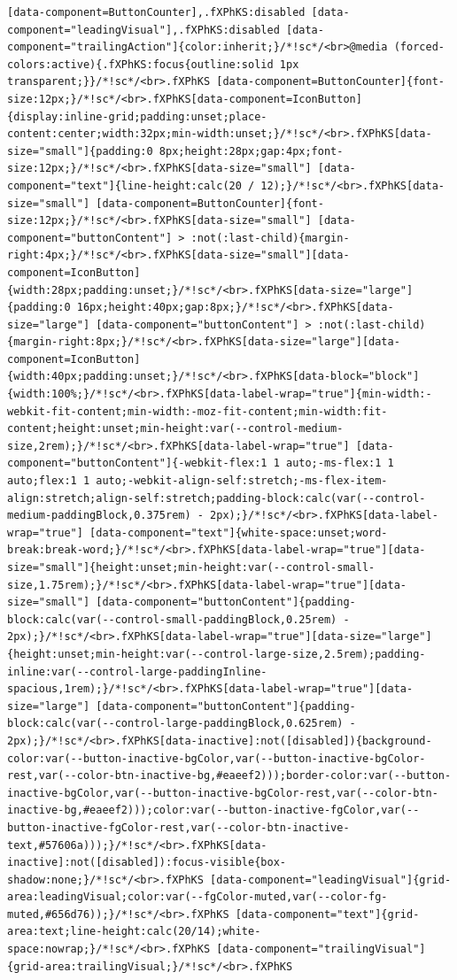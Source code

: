 \documentclass[
  letterpaper,
]{book}
\begin{document}
\begin{verbatim}
[data-component=ButtonCounter],.fXPhKS:disabled [data-component="leadingVisual"],.fXPhKS:disabled [data-component="trailingAction"]{color:inherit;}/*!sc*/<br>@media (forced-colors:active){.fXPhKS:focus{outline:solid 1px transparent;}}/*!sc*/<br>.fXPhKS [data-component=ButtonCounter]{font-size:12px;}/*!sc*/<br>.fXPhKS[data-component=IconButton]{display:inline-grid;padding:unset;place-content:center;width:32px;min-width:unset;}/*!sc*/<br>.fXPhKS[data-size="small"]{padding:0 8px;height:28px;gap:4px;font-size:12px;}/*!sc*/<br>.fXPhKS[data-size="small"] [data-component="text"]{line-height:calc(20 / 12);}/*!sc*/<br>.fXPhKS[data-size="small"] [data-component=ButtonCounter]{font-size:12px;}/*!sc*/<br>.fXPhKS[data-size="small"] [data-component="buttonContent"] > :not(:last-child){margin-right:4px;}/*!sc*/<br>.fXPhKS[data-size="small"][data-component=IconButton]{width:28px;padding:unset;}/*!sc*/<br>.fXPhKS[data-size="large"]{padding:0 16px;height:40px;gap:8px;}/*!sc*/<br>.fXPhKS[data-size="large"] [data-component="buttonContent"] > :not(:last-child){margin-right:8px;}/*!sc*/<br>.fXPhKS[data-size="large"][data-component=IconButton]{width:40px;padding:unset;}/*!sc*/<br>.fXPhKS[data-block="block"]{width:100%;}/*!sc*/<br>.fXPhKS[data-label-wrap="true"]{min-width:-webkit-fit-content;min-width:-moz-fit-content;min-width:fit-content;height:unset;min-height:var(--control-medium-size,2rem);}/*!sc*/<br>.fXPhKS[data-label-wrap="true"] [data-component="buttonContent"]{-webkit-flex:1 1 auto;-ms-flex:1 1 auto;flex:1 1 auto;-webkit-align-self:stretch;-ms-flex-item-align:stretch;align-self:stretch;padding-block:calc(var(--control-medium-paddingBlock,0.375rem) - 2px);}/*!sc*/<br>.fXPhKS[data-label-wrap="true"] [data-component="text"]{white-space:unset;word-break:break-word;}/*!sc*/<br>.fXPhKS[data-label-wrap="true"][data-size="small"]{height:unset;min-height:var(--control-small-size,1.75rem);}/*!sc*/<br>.fXPhKS[data-label-wrap="true"][data-size="small"] [data-component="buttonContent"]{padding-block:calc(var(--control-small-paddingBlock,0.25rem) - 2px);}/*!sc*/<br>.fXPhKS[data-label-wrap="true"][data-size="large"]{height:unset;min-height:var(--control-large-size,2.5rem);padding-inline:var(--control-large-paddingInline-spacious,1rem);}/*!sc*/<br>.fXPhKS[data-label-wrap="true"][data-size="large"] [data-component="buttonContent"]{padding-block:calc(var(--control-large-paddingBlock,0.625rem) - 2px);}/*!sc*/<br>.fXPhKS[data-inactive]:not([disabled]){background-color:var(--button-inactive-bgColor,var(--button-inactive-bgColor-rest,var(--color-btn-inactive-bg,#eaeef2)));border-color:var(--button-inactive-bgColor,var(--button-inactive-bgColor-rest,var(--color-btn-inactive-bg,#eaeef2)));color:var(--button-inactive-fgColor,var(--button-inactive-fgColor-rest,var(--color-btn-inactive-text,#57606a)));}/*!sc*/<br>.fXPhKS[data-inactive]:not([disabled]):focus-visible{box-shadow:none;}/*!sc*/<br>.fXPhKS [data-component="leadingVisual"]{grid-area:leadingVisual;color:var(--fgColor-muted,var(--color-fg-muted,#656d76));}/*!sc*/<br>.fXPhKS [data-component="text"]{grid-area:text;line-height:calc(20/14);white-space:nowrap;}/*!sc*/<br>.fXPhKS [data-component="trailingVisual"]{grid-area:trailingVisual;}/*!sc*/<br>.fXPhKS 
\end{verbatim}
\end{document}
